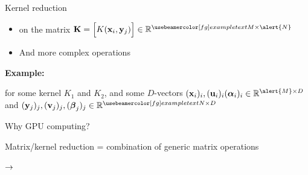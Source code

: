\documentclass[14pt]{beamer}
\begin{document}
\begin{frame}{Kernel reduction}

\bigskip
\begin{itemize}
\setitsep{1.5em}
\item {} on the matrix $\mb K = \Big[K(\mb x_i, \mb y_j)\Big] \in \RR^{\myexample{M}\times\alert{N}}$
\item And more complex operations
\end{itemize}

\bigskip\bigskip

{\small
\textbf{Example:} \hfill {} \hfill ~

\bigskip

for some kernel $K_1$ and $K_2$, and some $D$-vectors $(\mb x_i)_i, (\mb u_i)_i\\(\mbg\alpha_i)_i \in \RR^{\alert{M}\times D}$ and $(\mb y_j)_j, (\mb v_j)_j, (\mbg\beta_j)_j \in \RR^{\myexample{N}\times D}$}\bigskip

\end{frame}


%
%
%
%
%
%
%
%



\begin{frame}{Why GPU computing?}

Matrix/kernel reduction = combination of generic matrix operations

\bigskip

\begin{center}
$\rightarrow$ 
\end{center}

\end{frame}
\end{document}
